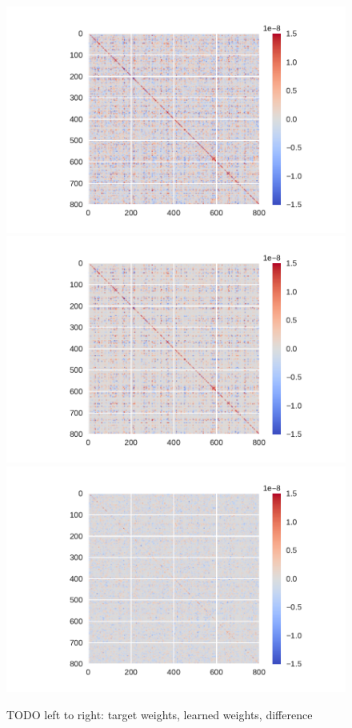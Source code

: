 \begin{figure}
    \centering
    \includegraphics[scale=0.4]{figures/aml-target-weights}
    \includegraphics[scale=0.4]{figures/aml-learned-weights}
    \includegraphics[scale=0.4]{figures/aml-weight-diff}
    \caption{TODO left to right: target weights, learned weights, difference}\label{aml:weights}
\end{figure}
